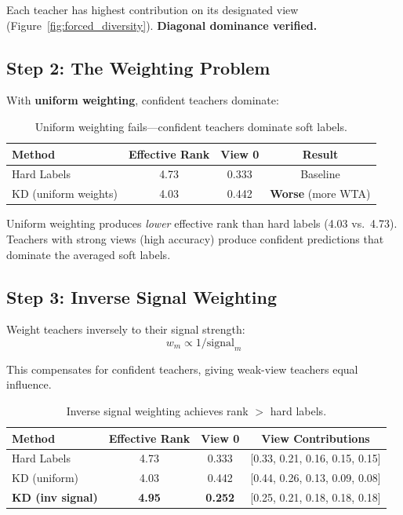 \documentclass{article}
\begin{document}
Each teacher has highest contribution on its designated view (Figure~\ref{fig:forced_diversity}). \textbf{Diagonal dominance verified.}

\subsection{Step 2: The Weighting Problem}

With \textbf{uniform weighting}, confident teachers dominate:

\begin{table}[h]
\centering
\caption{Uniform weighting fails---confident teachers dominate soft labels.}
\label{tab:uniform}
\begin{tabular}{@{}lccc@{}}
\toprule
Method & Effective Rank & View 0 & Result \\
\midrule
Hard Labels & 4.73 & 0.333 & Baseline \\
KD (uniform weights) & 4.03 & 0.442 & \textbf{Worse} (more WTA) \\
\bottomrule
\end{tabular}
\end{table}

Uniform weighting produces \textit{lower} effective rank than hard labels (4.03 vs.\ 4.73). Teachers with strong views (high accuracy) produce confident predictions that dominate the averaged soft labels.

\subsection{Step 3: Inverse Signal Weighting}

Weight teachers inversely to their signal strength:
\begin{equation}
    w_m \propto 1 / \text{signal}_m
\end{equation}

This compensates for confident teachers, giving weak-view teachers equal influence.

\begin{table}[h]
\centering
\caption{Inverse signal weighting achieves rank $>$ hard labels.}
\label{tab:inverse}
\begin{tabular}{@{}lccc@{}}
\toprule
Method & Effective Rank & View 0 & View Contributions \\
\midrule
Hard Labels & 4.73 & 0.333 & [0.33, 0.21, 0.16, 0.15, 0.15] \\
KD (uniform) & 4.03 & 0.442 & [0.44, 0.26, 0.13, 0.09, 0.08] \\
\textbf{KD (inv signal)} & \textbf{4.95} & \textbf{0.252} & [0.25, 0.21, 0.18, 0.18, 0.18] \\
\bottomrule
\end{tabular}
\end{table}
\end{document}
